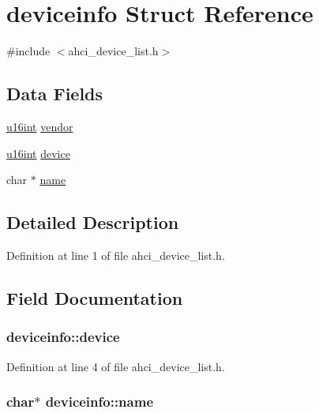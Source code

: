 \hypertarget{structdeviceinfo}{}\section{deviceinfo Struct Reference}
\label{structdeviceinfo}


{\ttfamily \#include $<$ahci\+\_\+device\+\_\+list.\+h$>$}

\subsection*{Data Fields}
\begin{DoxyCompactItemize}
\item 
\hyperlink{common_8h_ade81be9b965e7be1641f9792ba8af75e}{u16int} \hyperlink{structdeviceinfo_a5c3543ae796c7c71e2c2bc4115993032}{vendor}
\item 
\hyperlink{common_8h_ade81be9b965e7be1641f9792ba8af75e}{u16int} \hyperlink{structdeviceinfo_a3993f13c10f3be69e3113f20d2b6e9ca}{device}
\item 
char $\ast$ \hyperlink{structdeviceinfo_a9fbfd796851d53a945a0d4f4ea96a45f}{name}
\end{DoxyCompactItemize}


\subsection{Detailed Description}


Definition at line 1 of file ahci\+\_\+device\+\_\+list.\+h.



\subsection{Field Documentation}
\subsubsection[{\texorpdfstring{device}{device}}]{ deviceinfo\+::device}\hypertarget{structdeviceinfo_a3993f13c10f3be69e3113f20d2b6e9ca}{}\label{structdeviceinfo_a3993f13c10f3be69e3113f20d2b6e9ca}


Definition at line 4 of file ahci\+\_\+device\+\_\+list.\+h.

\subsubsection[{\texorpdfstring{name}{name}}]{\setlength{\rightskip}{0pt plus 5cm}char$\ast$ deviceinfo\+::name}\hypertarget{structdeviceinfo_a9fbfd796851d53a945a0d4f4ea96a45f}{}\label{structdeviceinfo_a9fbfd796851d53a945a0d4f4ea96a45f}


